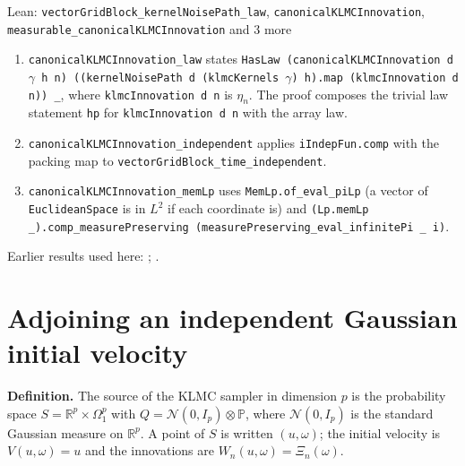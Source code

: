 \documentclass[11pt,a4paper]{article}
\begin{document}
\begin{leanbox}{Lean: \texttt{vectorGridBlock\_\allowbreak{}kernelNoisePath\_\allowbreak{}law}, \texttt{canonicalKLMCInnovation}, \texttt{measurable\_\allowbreak{}canonicalKLMCInnovation} and 3 more}
\begin{enumerate}
\item \texttt{canonical\allowbreak{}KLMCInnovation\_\allowbreak{}law} states \texttt{Has\allowbreak{}Law (canonical\allowbreak{}KLMCInnovation d \ensuremath{\gamma} h n) ((kernel\allowbreak{}Noise\allowbreak{}Path d (klmc\allowbreak{}Kernels \ensuremath{\gamma}) h).\allowbreak{}map (klmc\allowbreak{}Innovation d n)) \_\allowbreak{}}, where \texttt{klmc\allowbreak{}Innovation d n} is \(\eta_n\). The proof composes the trivial law statement \texttt{hp} for \texttt{klmc\allowbreak{}Innovation d n} with the array law.

\item \texttt{canonical\allowbreak{}KLMCInnovation\_\allowbreak{}independent} applies \texttt{i\allowbreak{}Indep\allowbreak{}Fun.\allowbreak{}comp} with the packing map to \texttt{vector\allowbreak{}Grid\allowbreak{}Block\_\allowbreak{}time\_\allowbreak{}independent}.

\item \texttt{canonical\allowbreak{}KLMCInnovation\_\allowbreak{}mem\allowbreak{}Lp} uses \texttt{Mem\allowbreak{}Lp.\allowbreak{}of\_\allowbreak{}eval\_\allowbreak{}pi\allowbreak{}Lp} (a vector of \texttt{Euclidean\allowbreak{}Space} is in \(L^2\) if each coordinate is) and \texttt{(Lp.\allowbreak{}mem\allowbreak{}Lp \_\allowbreak{}).\allowbreak{}comp\_\allowbreak{}measure\allowbreak{}Preserving (measure\allowbreak{}Preserving\_\allowbreak{}eval\_\allowbreak{}infinite\allowbreak{}Pi \_\allowbreak{} i)}.

\end{enumerate}
\end{leanbox}


Earlier results used here: \cite[Section~3.8.16]{LangevinLean2026ULASC}; \cite[Section~3.8.17]{LangevinLean2026ULASC}.

\section{\texorpdfstring{Adjoining an independent Gaussian initial velocity}{Adjoining an independent Gaussian initial velocity}}


\textbf{Definition.} The source of the KLMC sampler in dimension \(p\) is the probability space \(S=\mathbb R^p\times\Omega_1^{p}\) with \(Q=\mathcal N(0,I_p)\otimes\mathbb P\), where \(\mathcal N(0,I_p)\) is the standard Gaussian measure on \(\mathbb R^p\). A point of \(S\) is written \((u,\omega)\); the initial velocity is \(V(u,\omega)=u\) and the innovations are \(W_n(u,\omega)=\Xi_n(\omega)\).
\end{document}
